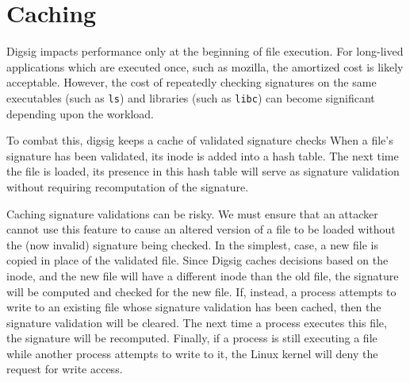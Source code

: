 \documentclass{article}
\begin{document}

\section{Caching}

Digsig impacts performance only at the beginning of file execution.  For
long-lived applications which are executed once, such as mozilla, the
amortized cost is likely acceptable.  However, the cost of repeatedly
checking signatures on the same executables (such as {\tt ls}) and
libraries (such as {\tt libc}) can become significant depending upon
the workload.

To combat this, digsig keeps a cache of validated signature checks
When a file's signature has been validated, its inode is added into
a hash table.  The next time the file is loaded, its presence in
this hash table will serve as signature validation without requiring
recomputation of the signature.

Caching signature validations can be risky.  We must ensure that an
attacker cannot use this feature to cause an altered version of a file
to be loaded without the (now invalid) signature being checked.  In
the simplest, case, a new file is copied in place of the validated file.
Since Digsig caches decisions based on the inode, and the new file will
have a different
inode than the old file, the signature will be computed and checked for the
new file.  If, instead, a process attempts to write to an existing file
whose signature validation has been cached, then the signature
validation will be cleared.  The next time a process executes this file,
the signature will be recomputed.  Finally, if a process is still
executing a file while another process attempts to write to it, the
Linux kernel will deny the request for write access.
\end{document}
